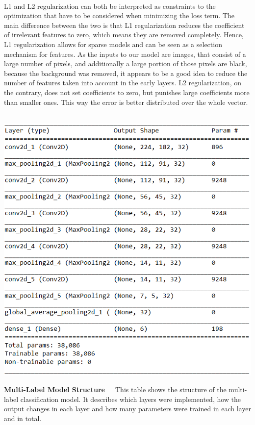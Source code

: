 \\
L1 and L2 regularization can both be interpreted as constraints to the optimization that have to be considered when minimizing the loss term. The main difference between the two is that L1 regularization reduces the coefficient of irrelevant features to zero, which means they are removed completely. Hence, L1 regularization allows for sparse models and can be seen as a selection mechanism for features. As the inputs to our model are images, that consist of a large number of pixels, and additionally a large portion of those pixels are black, because the background was removed, it appears to be a good idea to reduce the number of features taken into account in the early layers. L2 regularization, on the contrary, does not set coefficients to zero, but punishes large coefficients more than smaller ones. This way the error is better distributed over the whole vector. \\
\\
\begin{table}[h]
	\centering
	\includegraphics[scale=0.8]{Figures/chapter04/multilabel_structure.png}
	\decoRule
	\caption[Multi-Label Model Structure]{\textbf{Multi-Label Model Structure}~~~This table shows the structure of the multi-label classification model. It describes which layers were implemented, how the output changes in each layer and how many parameters were trained in each layer and in total.}
	\label{fig:MultilabelStructure}
\end{table}

